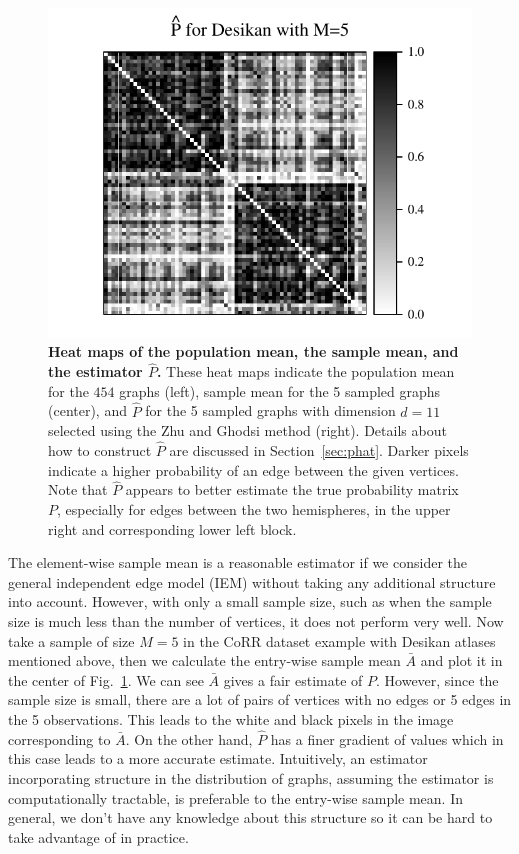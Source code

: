 \documentclass[10pt,letterpaper]{article}
\renewcommand{\hat}{\widehat}
\begin{document}
\begin{figure}[!tbp]
\includegraphics[height=.205\textheight]{Phat_desikan_m5.pdf}
\caption{{\bf Heat maps of the population mean, the sample mean, and the estimator $\hat{P}$.}
These heat maps indicate the population mean for the $454$ graphs (left), sample mean for the 5 sampled graphs (center), and $\hat{P}$ for the 5 sampled graphs with dimension $d=11$ selected using the Zhu and Ghodsi method (right). Details about how to construct $\hat{P}$ are discussed in Section~\ref{sec:phat}.
Darker pixels indicate a higher probability of an edge between the given vertices.
Note that $\hat{P}$ appears to better estimate the true probability matrix $P$, especially for edges between the two hemispheres, in the upper right and corresponding lower left block.
}
\label{fig:Matrix_desikan_m5}
\end{figure}



The element-wise sample mean is a reasonable estimator if we consider the general independent edge model (IEM) \citep{bollobas2007phase} without taking any additional structure into account. 
However, with only a small sample size, such as when the sample size is much less than the number of vertices, it does not perform very well.
Now take a sample of size $M=5$ in the CoRR dataset example with Desikan atlases mentioned above, then we calculate the entry-wise sample mean $\bar{A}$ and plot it in the center of Fig.~\ref{fig:Matrix_desikan_m5}. We can see $\bar{A}$ gives a fair estimate of $P$. However, since the sample size is small, there are a lot of pairs of vertices with no edges or 5 edges in the 5 observations. This leads to the white and black pixels in the image corresponding to $\bar{A}$.
On the other hand, $\hat{P}$ has a finer gradient of values which in this case leads to a more accurate estimate.
Intuitively, an estimator incorporating structure in the distribution of graphs, assuming the estimator is computationally tractable, is preferable to the entry-wise sample mean. 
In general, we don't have any knowledge about this structure so it can be hard to take advantage of in practice.
\end{document}
